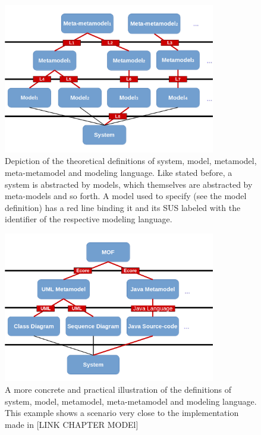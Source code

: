 \documentclass[tuberlin,cic,tc,openright,english,noabntcite]{iiufrgs}
\begin{document}
\begin{description}
\begin{figure}[h]
    \caption{Depiction of the theoretical definitions of system, model, metamodel, meta-metamodel and modeling language. Like stated before, a system is abstracted by models, which themselves are abstracted by meta-models and so forth. A model used to specify (see the model definition) has a red line binding it and its SUS labeled with the identifier of the respective modeling language.}
    \begin{center}
        \includegraphics[width=25em]{model_scheme}
    \end{center}
    \label{fig:model_scheme}
\end{figure}
\begin{figure}[h]
    \caption{A more concrete and practical illustration of the definitions of system, model, metamodel, meta-metamodel and modeling language. This example shows a scenario very close to the implementation made in [LINK CHAPTER MODEl]}
    \begin{center}
        \includegraphics[width=25em]{model_scheme_practice}
    \end{center}
    \label{fig:model_scheme_practice}
\end{figure}
	

\end{description}
\end{document}
